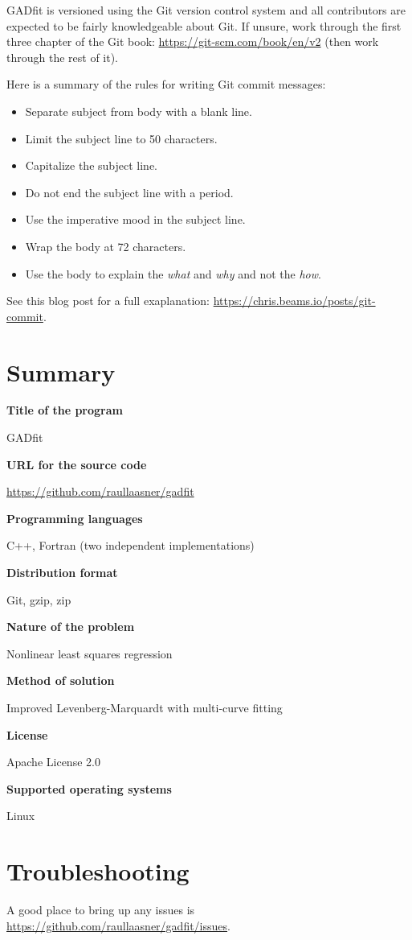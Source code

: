 \documentclass{article}
\begin{document}
GADfit is versioned using the Git version control system and all contributors are expected to be fairly knowledgeable about Git. If unsure, work through the first three chapter of the Git book: \url{https://git-scm.com/book/en/v2} (then work through the rest of it).

Here is a summary of the rules for writing Git commit messages:
\begin{itemize}
\item Separate subject from body with a blank line.
\item Limit the subject line to 50 characters.
\item Capitalize the subject line.
\item Do not end the subject line with a period.
\item Use the imperative mood in the subject line.
\item Wrap the body at 72 characters.
\item Use the body to explain the \textit{what} and \textit{why} and not the \textit{how}.
\end{itemize}
See this blog post for a full exaplanation: \url{https://chris.beams.io/posts/git-commit}.

\section{Summary}

\noindent\textbf{Title of the program}

GADfit

\noindent\textbf{URL for the source code}

\url{https://github.com/raullaasner/gadfit}

\noindent\textbf{Programming languages}

C++, Fortran (two independent implementations)

\noindent\textbf{Distribution format}

Git, gzip, zip

\noindent\textbf{Nature of the problem}

Nonlinear least squares regression

\noindent\textbf{Method of solution}

Improved Levenberg-Marquardt with multi-curve fitting

\noindent\textbf{License}

Apache License 2.0

\noindent\textbf{Supported operating systems}

Linux

\section{Troubleshooting}

A good place to bring up any issues is \\ \url{https://github.com/raullaasner/gadfit/issues}.



\end{document}
